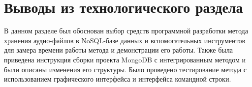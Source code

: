 \section{Выводы из технологического раздела}

В данном разделе был обоснован выбор средств программной разработки метода хранения аудио-файлов в NoSQL-базе данных и вспомогательных инструментов для замера времени работы метода и демонстрации его работы. Также была приведена инструкция сборки проекта MongoDB с интегрированным методом и были описаны изменения его структуры. Было проведено тестирование метода с использованием графического интерфейса и интерфейса командной строки.